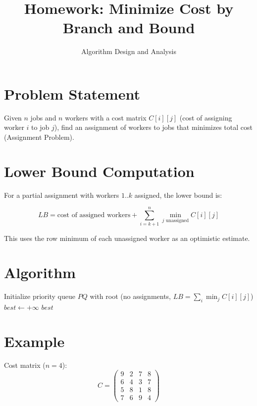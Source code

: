 \documentclass[12pt]{article}
\title{Homework: Minimize Cost by Branch and Bound}
\author{Algorithm Design and Analysis}
\date{}
\begin{document}
\maketitle

\section{Problem Statement}

Given $n$ jobs and $n$ workers with a cost matrix $C[i][j]$ (cost of assigning worker $i$
to job $j$), find an assignment of workers to jobs that minimizes total cost (Assignment Problem).

\section{Lower Bound Computation}

For a partial assignment with workers $1..k$ assigned, the lower bound is:

\[
  LB = \text{cost of assigned workers} + \sum_{i=k+1}^{n} \min_{j \text{ unassigned}} C[i][j]
\]

This uses the row minimum of each unassigned worker as an optimistic estimate.

\section{Algorithm}

\begin{algorithm}[H]
\SetAlgoLined
{}
Initialize priority queue $PQ$ with root (no assignments, $LB = \sum_i \min_j C[i][j]$)\;
$best \leftarrow +\infty$\;
\Return $best$\;
\caption{B\&B for Assignment Problem (Least-Cost Branch)}
\end{algorithm}

\section{Example}

Cost matrix ($n=4$):
\[
C = \begin{pmatrix}
9 & 2 & 7 & 8 \\
6 & 4 & 3 & 7 \\
5 & 8 & 1 & 8 \\
7 & 6 & 9 & 4
\end{pmatrix}
\]
\end{document}
